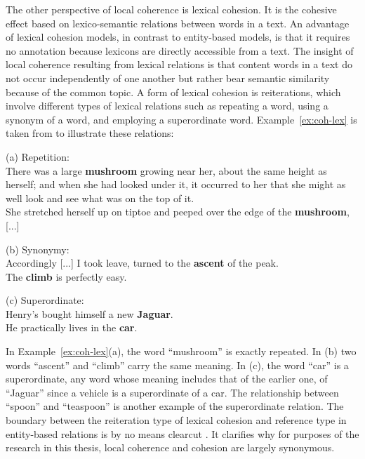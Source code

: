 The other perspective of local coherence is lexical cohesion. 
It is the cohesive effect based on \mbox{lexico-semantic} relations between words in a text. 
An advantage of lexical cohesion models, in contrast to \mbox{entity-based} models, is that it requires no annotation because lexicons are directly accessible from a text. 
The insight of local coherence resulting from lexical relations is that content words in a text do not occur independently of one another but rather bear semantic similarity because of the common topic. 
A form of lexical cohesion is reiterations, which involve different types of lexical relations such as repeating a word, using a synonym of a word, and employing a superordinate word. 
Example~\ref{ex:coh-lex} is taken from  to illustrate these relations:

\begin{examples}
	\label{ex:coh-lex}
	(a) Repetition: \\
	There was a large \textbf{mushroom} growing near her, about the same height as herself; and when she had looked under it, it occurred to her that she might as well look and see what was on the top of it.\\
	She stretched herself up on tiptoe and peeped over the edge of the \textbf{mushroom}, [...] 

	(b) Synonymy: \\
	Accordingly [...] I took leave, turned to the \textbf{ascent} of the peak. \\
	The \textbf{climb} is perfectly easy. 

	(c) Superordinate: \\
	Henry's bought himself a new \textbf{Jaguar}. \\
	He practically lives in the \textbf{car}. 

\end{examples} 

In Example~\ref{ex:coh-lex}(a), the word ``mushroom'' is exactly repeated. 
In (b) two words ``ascent'' and ``climb'' carry the same meaning. 
In (c), the word ``car'' is a superordinate, any word whose meaning includes that of the earlier one, of ``Jaguar'' since a vehicle is a superordinate of a car. 
The relationship between ``spoon'' and ``teaspoon'' is another example of the superordinate relation. 
The boundary between the reiteration type of lexical cohesion and reference type in entity-based relations is by no means clearcut \cite{halliday76}. 
It clarifies why for purposes of the research in this thesis, local coherence and cohesion are largely synonymous. 

